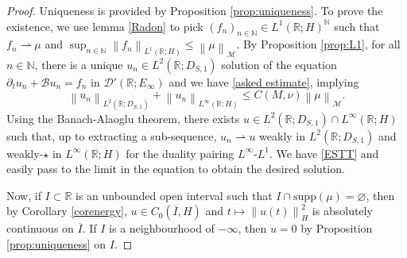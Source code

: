 \documentclass[11pt, letterpaper]{amsart}
\theoremstyle{definition}
\theoremstyle{remark}
\numberwithin{equation}{section}
\begin{document}
\begin{proof}
    Uniqueness is provided by Proposition \ref{prop:uniqueness}. To prove the existence, we use lemma \ref{Radon} to pick  $\left ( f_n \right )_{n \in \mathbb{N}}\in L^1(\mathbb{R};H)^\mathbb{N}$ such that 
    $f_n  \rightharpoonup \mu$   and   $\sup_{n\in \mathbb{N}} \left \| f_n \right \|_{L^1(\mathbb{R};H)} \leq \left \| \mu \right \|_{\mathcal{M}}.$
By Proposition \ref{prop:L1}, for all $n \in \mathbb{N}$, there is a unique $u_n \in L^2(\mathbb{R};D_{S,1})$ solution of the equation $\partial_t u_n+\mathcal{B}u_n= f_n$ in $\mathcal{D}'(\mathbb{R};E_\infty)$ and we have \eqref{asked estimate}, implying
\begin{equation}\label{EST}
    \left \| u_n \right \|_{L^2(\mathbb{R};D_{S,1})}+\left \| u_n \right \|_{L^\infty(\mathbb{R};H)} \leq C(M,\nu) \left \| \mu \right \|_{\mathcal{M}}.
\end{equation}
Using the Banach-Alaoglu theorem, there exists $u \in L^2(\mathbb{R};D_{S,1}) \cap L^\infty(\mathbb{R};H)$ such that, up to extracting a sub-sequence, $u_n \rightharpoonup u$ weakly in $L^2(\mathbb{R};D_{S,1})$ and weakly-$\star$ in $L^\infty(\mathbb{R};H)$ for the duality pairing $L^\infty$-$L^1$. We have \eqref{ESTT} and  easily  pass to the limit in the equation to obtain the desired solution. 


Now, if $I \subset \mathbb{R}$ is an unbounded open interval such that $ I \cap \mathrm{supp}(\mu)= \varnothing$, then by Corollary \ref{corenergy}, $u \in C_0(\overline{I},H)$ and $t \mapsto \left \| u(t) \right \|_H^2$ is absolutely continuous on $\overline{I}$. If $I$ is a neighbourhood of $-\infty$, then $u=0$ by Proposition \ref{prop:uniqueness} on $I$. 
 \end{proof}
\end{document}
